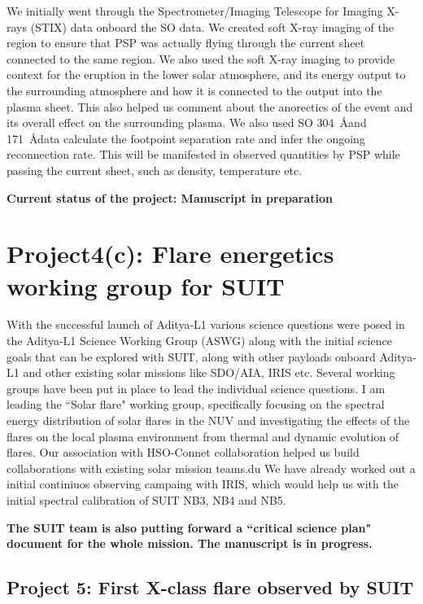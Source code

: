 \documentclass[a4paper,11pt]{article}
\begin{document}
We initially went through the Spectrometer/Imaging Telescope for Imaging X-rays (STIX) data onboard the SO data. We created soft X-ray imaging of the region to ensure that PSP was actually flying through the current sheet connected to the same region. We also used the soft X-ray imaging to provide context for the eruption in the lower solar atmosphere, and its energy output to the surrounding atmosphere and how it is connected to the output into the plasma sheet. This also helped us comment about the anorectics of the event and its overall effect on the surrounding plasma. We also used SO 304~\AA and 171~\AA data calculate the footpoint separation rate and infer the ongoing reconnection rate. This will be manifested in observed quantities by PSP while passing the current sheet, such as density, temperature etc.

\textbf{Current status of the project: Manuscript in preparation}

\section*{Project4(c): Flare energetics working group for SUIT}

With the successful launch of Aditya-L1 various science questions were posed in the Aditya-L1 Science Working Group (ASWG) along with the initial science goals that can be explored with SUIT, along with other payloads onboard Aditya-L1 and other existing solar missions like SDO/AIA, IRIS etc. Several working groups have been put in place to lead the individual science questions. I am leading the ``Solar flare" working group, specifically focusing on the spectral energy distribution of solar flares in the NUV and investigating the effects of the flares on the local plasma environment from thermal and dynamic evolution of flares. Our association with HSO-Connet collaboration helped us build collaborations with existing solar mission teams.du We have already worked out a initial continiuos observing campaing with IRIS, which would help us with the initial spectral calibration of SUIT NB3, NB4 and NB5.

\textbf{The SUIT team is also putting forward a ``critical science plan" document for the whole mission. The manuscript is in progress.}


\subsection*{Project 5: First X-class flare observed by SUIT}
\end{document}
